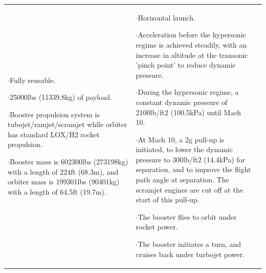 {\begin{landscape}
\begin{xltabular}{\linewidth}{|X|X|X|}
	$\cdot$Fully reusable.
	
	$\cdot$25000lbs (11339.8kg) of payload.
	
	$\cdot$Booster propulsion system is tubojet/ramjet/scramjet while orbiter has standard LOX/H2 rocket propulsion. 
	
	$\cdot$Booster mass is 602300lbs (273198kg) with a length of 224ft (68.3m), and orbiter mass is 199301lbs (90401kg) with a length of 64.5ft (19.7m).
	
	&\small
	
	$\cdot$Horizontal launch.
	
	$\cdot$Acceleration before the hypersonic regime is achieved steadily, with an increase in altitude at the transonic 'pinch point' to reduce dynamic pressure. 
	
	$\cdot$During the hypersonic regime, a constant dynamic pressure of 2100lb/ft2 (100.5kPa) until Mach 10.
	
	$\cdot$At Mach 10, a 2g pull-up is initiated, to lower the dynamic pressure to 300lb/ft2 (14.4kPa) for separation, and to improve the flight path angle at separation. The scramjet engines are cut off at the start of this pull-up.  
	
	$\cdot$The booster flies to orbit under rocket power. 
	
	$\cdot$The booster initiates a turn, and cruises back under turbojet power. 
	

\end{xltabular}
\end{landscape}}
